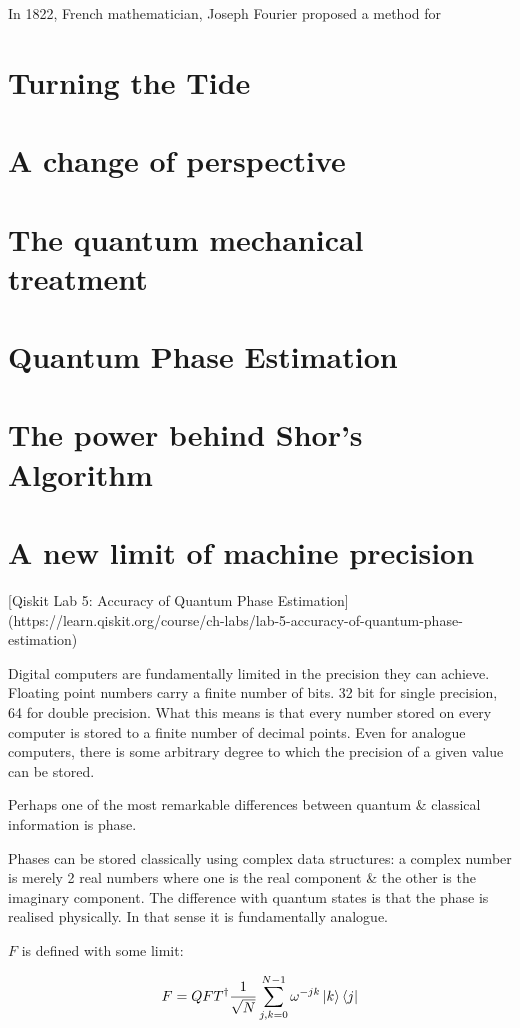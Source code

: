 \documentclass{book}
\begin{document}
In 1822, French mathematician, Joseph Fourier proposed a method for 

\section{Turning the Tide}
\section{A change of perspective }
\section{The quantum mechanical treatment}

\section{Quantum Phase Estimation}
\section{The power behind Shor's Algorithm}
\section{A new limit of machine precision}


[Qiskit Lab 5: Accuracy of Quantum Phase Estimation](https://learn.qiskit.org/course/ch-labs/lab-5-accuracy-of-quantum-phase-estimation)

Digital computers are fundamentally limited in the precision they can achieve. Floating point numbers carry a finite number of bits. 32 bit for single precision, 64 for double precision. What this means is that every number stored on every computer is stored to a finite number of decimal points. Even for analogue computers, there is some arbitrary degree to which the precision of a given value can be stored. 

Perhaps one of the most remarkable differences between quantum & classical information is phase. 

Phases can be stored classically using complex data structures: a complex number is merely 2 real numbers where one is the real component & the other is the imaginary component. The difference with quantum states is that the phase is realised physically. In that sense it is fundamentally analogue. 

$F$ is defined with some limit:

$$ F = QFT^\dagger \frac{1}{\sqrt{N}}\sum_{j,k = 0}^{N-1} \omega^{-jk}\ket{k}\bra{j}$$
\end{document}
